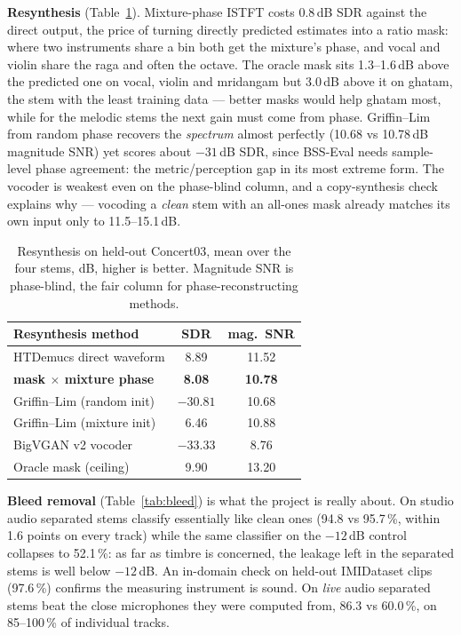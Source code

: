 \documentclass[11pt,a4paper,twocolumn]{article}
\begin{document}
\textbf{Resynthesis} (Table~\ref{tab:resynth}). Mixture-phase ISTFT costs 0.8\,dB SDR against the
direct output, the price of turning directly predicted estimates into a ratio mask: where two
instruments share a bin both get the mixture's phase, and vocal and violin share the raga and
often the octave. The oracle mask sits 1.3--1.6\,dB above the predicted one on vocal, violin and
mridangam but 3.0\,dB above it on ghatam, the stem with the least training data --- better masks
would help ghatam most, while for the melodic stems the next gain must come from phase.
Griffin--Lim from random phase recovers the \emph{spectrum} almost perfectly (10.68 vs 10.78\,dB
magnitude SNR) yet scores about $-31$\,dB SDR, since BSS-Eval needs sample-level phase agreement:
the metric/perception gap in its most extreme form. The vocoder is weakest even on the
phase-blind column, and a copy-synthesis check explains why --- vocoding a \emph{clean} stem with
an all-ones mask already matches its own input only to 11.5--15.1\,dB.

\begin{table}[h]
\centering
\small
\begin{tabular}{lcc}
\toprule
Resynthesis method & SDR & mag.\ SNR \\
\midrule
HTDemucs direct waveform & 8.89 & 11.52 \\
\textbf{mask $\times$ mixture phase} & \textbf{8.08} & \textbf{10.78} \\
Griffin--Lim (random init) & $-30.81$ & 10.68 \\
Griffin--Lim (mixture init) & 6.46 & 10.88 \\
BigVGAN v2 vocoder & $-33.33$ & 8.76 \\
Oracle mask (ceiling) & 9.90 & 13.20 \\
\bottomrule
\end{tabular}
\caption{Resynthesis on held-out Concert03, mean over the four stems, dB, higher is better.
Magnitude SNR is phase-blind, the fair column for phase-reconstructing methods.}
\label{tab:resynth}
\end{table}

\textbf{Bleed removal} (Table~\ref{tab:bleed}) is what the project is really about. On studio
audio separated stems classify essentially like clean ones (94.8 vs 95.7\,\%, within 1.6 points on
every track) while the same classifier on the $-12$\,dB control collapses to 52.1\,\%: as far as
timbre is concerned, the leakage left in the separated stems is well below $-12$\,dB. An
in-domain check on held-out IMIDataset clips (97.6\,\%) confirms the measuring instrument is
sound. On \emph{live} audio separated stems beat the close microphones they were computed from,
86.3 vs 60.0\,\%, on 85--100\,\% of individual tracks.
\end{document}
